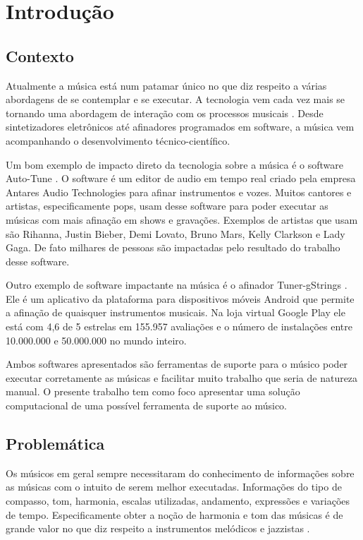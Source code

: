 \chapter[Introdução]{Introdução}
\label{chap:introducao}

\section{Contexto}
\label{sec:contexto}

Atualmente a música está num patamar único no que diz respeito a várias abordagens de se contemplar e se executar. A tecnologia vem cada vez mais se tornando uma abordagem de interação com os processos musicais \cite{makingmusictechnology}. Desde sintetizadores eletrônicos até afinadores programados em software, a música vem acompanhando o desenvolvimento técnico-científico.

Um bom exemplo de impacto direto da tecnologia sobre a música é o software Auto-Tune \cite{autotune}. O software é um editor de audio em tempo real criado pela empresa Antares Audio Technologies \cite{autotune2} para afinar instrumentos e vozes. Muitos cantores e artistas, especificamente pops, usam desse software para poder executar as músicas com mais afinação em shows e gravações. Exemplos de artistas que usam são Rihanna, Justin Bieber, Demi Lovato, Bruno Mars, Kelly Clarkson e Lady Gaga. De fato milhares de pessoas são impactadas pelo resultado do trabalho desse software.

Outro exemplo de software impactante na música é o afinador Tuner-gStrings \cite{afinador}. Ele é um aplicativo da plataforma para dispositivos móveis Android que permite a afinação de quaisquer instrumentos musicais. Na loja virtual Google Play ele está com 4,6 de 5 estrelas em 155.957 avaliações e o número de instalações entre 10.000.000 e 50.000.000 no mundo inteiro.

Ambos softwares apresentados são ferramentas de suporte para o músico poder executar corretamente as músicas e facilitar muito trabalho que seria de natureza manual. O presente trabalho tem como foco apresentar uma solução computacional de uma possível ferramenta de suporte ao músico.


\section{Problemática}
\label{sec:problematica}

Os músicos em geral sempre necessitaram do conhecimento de informações sobre as músicas com o intuito de serem melhor executadas. Informações do tipo de compasso, tom, harmonia, escalas utilizadas, andamento, expressões e variações de tempo. Especificamente obter a noção de harmonia e tom das músicas é de grande valor no que diz respeito a instrumentos melódicos e jazzistas \cite{jazzistas}.

